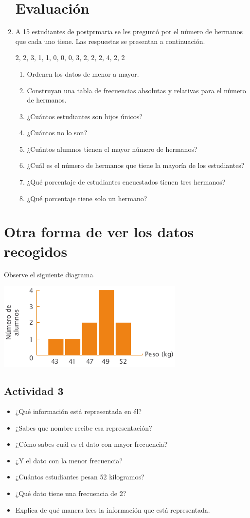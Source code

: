 \documentclass[10pt,twoside]{article}
\begin{document}
\begin{enumerate}
\section*{Evaluaci\'{o}n}
\item A 15 estudiantes de postprmaria se les preguntó por el número de hermanos que cada uno tiene. Las respuestas se presentan a continuación.
\begin{center}
2, 2, 3, 1, 1, 0, 0, 0, 3, 2, 2, 2, 4, 2, 2
\end{center}
\begin{enumerate}
\item Ordenen los datos de menor a mayor.
\item Construyan una tabla de frecuencias absolutas y relativas para el número de hermanos.
\item ¿Cuántos estudiantes son hijos únicos?
\item ¿Cuántos no lo son?
\item ¿Cuántos alumnos tienen el mayor número de hermanos? 
\item ¿Cuál es el número de hermanos que tiene la mayoría de los estudiantes?
\item ¿Qué porcentaje de estudiantes encuestados tienen tres hermanos?
\item ¿Qué porcentaje tiene solo un hermano?
\end{enumerate}
\end{enumerate}
\section*{Otra forma de ver los datos recogidos}
Observe el siguiente diagrama
\begin{center}
\includegraphics[scale=.75]{Images/diagrama_barras.png} 
\end{center}
\subsection*{Actividad 3}
\begin{itemize}
\item ¿Qué información está representada en él?
\item ¿Sabes que nombre recibe esa representación?
\item ¿Cómo sabes cuál es el dato con mayor frecuencia?
\item ¿Y el dato con la menor frecuencia?
\item ¿Cuántos estudiantes pesan 52 kilogramos?
\item ¿Qué dato tiene una frecuencia de 2?
\item Explica de qué manera lees la información que está representada.
\end{itemize}
\end{document}
